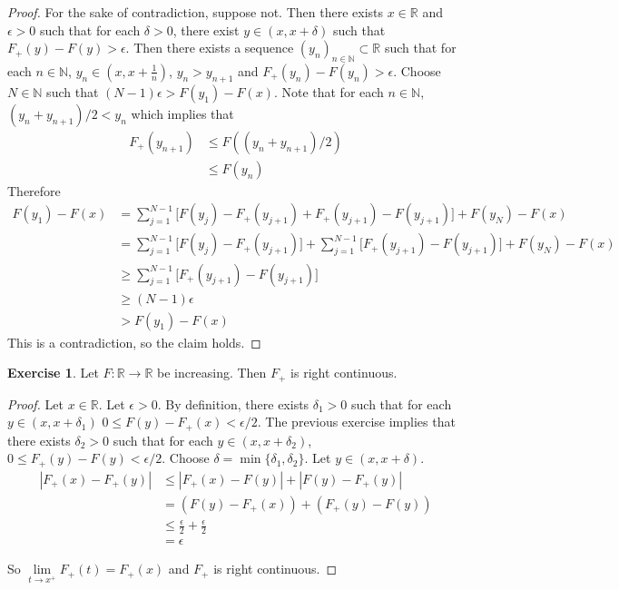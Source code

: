 \documentclass[12pt]{amsart}
\theoremstyle{definition}
\newtheorem{ex}[definition]{Exercise}
\newcommand{\del}{\delta}
\newcommand{\ep}{\epsilon}
\newcommand{\N}{\mathbb{N}}
\newcommand{\R}{\mathbb{R}}
\newcommand{\lex}[1]{\label{ex:#1}}
\begin{document}
	\begin{proof}
		For the sake of contradiction, suppose not. Then there exists $x \in \R$ and $\ep >0$ such that for each $\del >0$, there exist $y \in (x,x+\del)$ such that $F_+(y) - F(y) > \ep$. Then there exists a sequence $(y_n)_{n \in \N} \subset \R$ such that for each $n \in \N$, $y_n \in (x, x+\frac{1}{n})$, $y_n > y_{n+1}$ and $F_+(y_n) - F(y_n) > \ep$. Choose $N \in \N$ such that $(N-1)\ep > F(y_1) - F(x)$. Note that for each $n \in \N$, $(y_n + y_{n+1})/ 2 < y_n$ which implies that
		\begin{align*}
			F_+(y_{n+1})
			& \leq F((y_n + y_{n+1})/ 2) \\
			& \leq F(y_n)
		\end{align*}
		Therefore
		\begin{align*}
			F(y_1) - F(x) 
			&= \sum_{j=1}^{N-1} \bigg[F(y_j)-F_+(y_{j+1}) + F_+(y_{j+1}) - F(y_{j+1}) \bigg] + F(y_N)- F(x)\\
			& = \sum_{j=1}^{N-1} \bigg[F(y_j)-F_+(y_{j+1}) \bigg] + \sum_{j=1}^{N-1} \bigg[ F_+(y_{j+1}) - F(y_{j+1}) \bigg] + F(y_N)- F(x) \\
			& \geq \sum_{j=1}^{N-1} \bigg[ F_+(y_{j+1}) - F(y_{j+1}) \bigg]  \\
			& \geq (N-1)\ep \\
			& > F(y_1) - F(x)
		\end{align*}
		This is a contradiction, so the claim holds.
	\end{proof}
	
	\begin{ex} \lex{00000} 
		Let $F:\R \rightarrow \R$ be increasing. Then $F_+$ is right continuous. 
	\end{ex}
	
	\begin{proof}
		Let $x \in \R$. Let $\ep >0$. By definition, there exists $\del_1>0$ such that for each $y \in (x,x+\del_1)$ $0 \leq F(y)-F_+(x) < \ep/2$. The previous exercise implies that there exists $\del_2 >0$ such that for each $y \in (x,x+\del_2)$, $0 \leq F_+(y)-F(y) < \ep/2$. Choose $\del = \min\{\del_1, \del_2\}$. Let $y \in (x, x+\del)$.
		\begin{align*}
			|F_+(x) - F_+(y)|
			& \leq |F_+(x) - F(y)| + |F(y)- F_+(y)| \\
			& = (F(y) - F_+(x)) + (F_+(y) - F(y)) \\
			& \leq \frac{\ep}{2} + \frac{\ep}{2}\\
			& = \ep
		\end{align*}
		
		So $\lim\limits_{t \rightarrow x^+} F_+(t) = F_+(x)$ and $F_+$ is right continuous.
	\end{proof}
	
\end{document}
